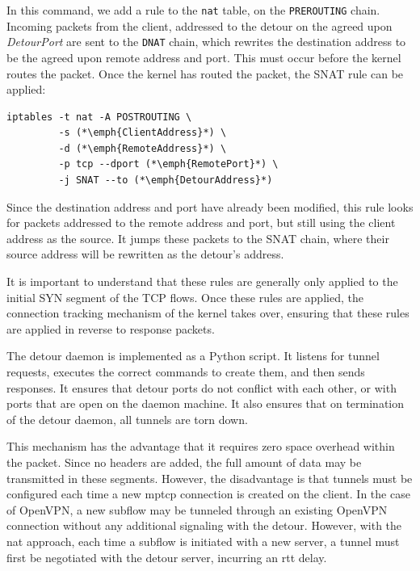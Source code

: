 \documentclass{cwru}
\begin{document}
In this command, we add a rule to the \texttt{nat} table, on the
\texttt{PREROUTING} chain. Incoming packets from the client, addressed to the
detour on the agreed upon \textit{DetourPort} are sent to the \texttt{DNAT}
chain, which rewrites the destination address to be the agreed upon remote
address and port. This must occur before the kernel routes the packet. Once the
kernel has routed the packet, the SNAT rule can be applied:

\begin{minipage}{\linewidth} %
\begin{lstlisting}
iptables -t nat -A POSTROUTING \
         -s (*\emph{ClientAddress}*) \
         -d (*\emph{RemoteAddress}*) \
         -p tcp --dport (*\emph{RemotePort}*) \
         -j SNAT --to (*\emph{DetourAddress}*)
\end{lstlisting}
\end{minipage}

Since the destination address and port have already been modified, this rule
looks for packets addressed to the remote address and port, but still using the
client address as the source. It jumps these packets to the SNAT chain, where
their source address will be rewritten as the detour's address.

It is important to understand that these rules are generally only applied to the
initial SYN segment of the TCP flows. Once these rules are applied, the
connection tracking mechanism of the kernel takes over, ensuring that these
rules are applied in reverse to response packets.

The detour daemon is implemented as a Python script. It listens for tunnel
requests, executes the correct commands to create them, and then sends
responses. It ensures that detour ports do not conflict with each other, or with
ports that are open on the daemon machine. It also ensures that on termination
of the detour daemon, all tunnels are torn down.

This mechanism has the advantage that it requires zero space overhead within the
packet. Since no headers are added, the full amount of data may be transmitted
in these segments. However, the disadvantage is that tunnels must be configured
each time a new \ac{mptcp} connection is created on the client. In the case of
OpenVPN, a new subflow may be tunneled through an existing OpenVPN connection
without any additional signaling with the detour. However, with the \ac{nat}
approach, each time a subflow is initiated with a new server, a tunnel must
first be negotiated with the detour server, incurring an \ac{rtt} delay.
\end{document}

